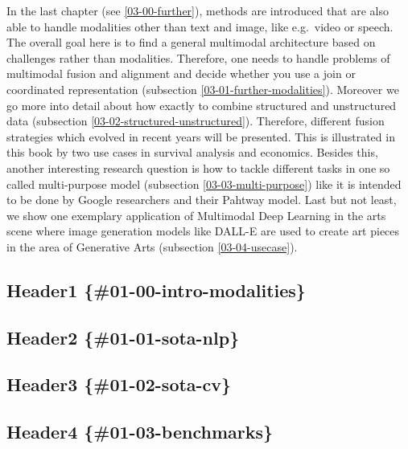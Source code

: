 \documentclass[
]{krantz}
\begin{document}
In the last chapter (see \ref{03-00-further}), methods are introduced that are also able to handle modalities other than text and image, like e.g.~video or speech. The overall goal here is to find a general multimodal architecture based on challenges rather than modalities. Therefore, one needs to handle problems of multimodal fusion and alignment and decide whether you use a join or coordinated representation (subsection \ref{03-01-further-modalities}). Moreover we go more into detail about how exactly to combine structured and unstructured data (subsection \ref{03-02-structured-unstructured}). Therefore, different fusion strategies which evolved in recent years will be presented. This is illustrated in this book by two use cases in survival analysis and economics. Besides this, another interesting research question is how to tackle different tasks in one so called multi-purpose model (subsection \ref{03-03-multi-purpose}) like it is intended to be done by Google researchers \citet{Pathways} and their Pahtway model. Last but not least, we show one exemplary application of Multimodal Deep Learning in the arts scene where image generation models like DALL-E \citep{DALLE} are used to create art pieces in the area of Generative Arts (subsection \ref{03-04-usecase}).

\hypertarget{header1-01-00-intro-modalities}{%
\subsection{Header1 \{\#01-00-intro-modalities\}}\label{header1-01-00-intro-modalities}}

\hypertarget{header2-01-01-sota-nlp}{%
\subsection{Header2 \{\#01-01-sota-nlp\}}\label{header2-01-01-sota-nlp}}

\hypertarget{header3-01-02-sota-cv}{%
\subsection{Header3 \{\#01-02-sota-cv\}}\label{header3-01-02-sota-cv}}

\hypertarget{header4-01-03-benchmarks}{%
\subsection{Header4 \{\#01-03-benchmarks\}}\label{header4-01-03-benchmarks}}
\end{document}
